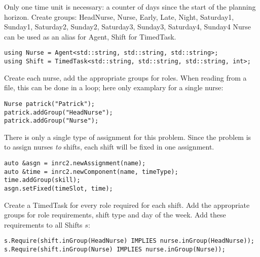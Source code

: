 
Only one time unit is necessary: a counter of days since the start of the planning horizon.
Create groups: HeadNurse, Nurse, Early, Late, Night, Saturday1, Sunday1, Saturday2, Sunday2, Saturday3, Sunday3, Saturday4, Sunday4
Nurse can be used as an alias for Agent, Shift for TimedTask.

\begin{verbatim}
using Nurse = Agent<std::string, std::string, std::string>;
using Shift = TimedTask<std::string, std::string, std::string, int>;
\end{verbatim}

Create each nurse, add the appropriate groups for roles. When reading from a file, this can be done in a loop; here only examplary for a single nurse:
\begin{verbatim}
Nurse patrick("Patrick");
patrick.addGroup("HeadNurse");
patrick.addGroup("Nurse");
\end{verbatim}

There is only a single type of assignment for this problem. Since the problem is to assign nurses \textit{to} shifts, each shift will be fixed in one assignment.
\begin{verbatim}
auto &asgn = inrc2.newAssignment(name);
auto &time = inrc2.newComponent(name, timeType);
time.addGroup(skill);
asgn.setFixed(timeSlot, time);
\end{verbatim}



Create a TimedTask for every role required for each shift. Add the appropriate groups for role requirements, shift type and day of the week.
Add these requirements to all Shifts $s$: 
\begin{verbatim}
s.Require(shift.inGroup(HeadNurse) IMPLIES nurse.inGroup(HeadNurse));
s.Require(shift.inGroup(Nurse) IMPLIES nurse.inGroup(Nurse));
\end{verbatim}


